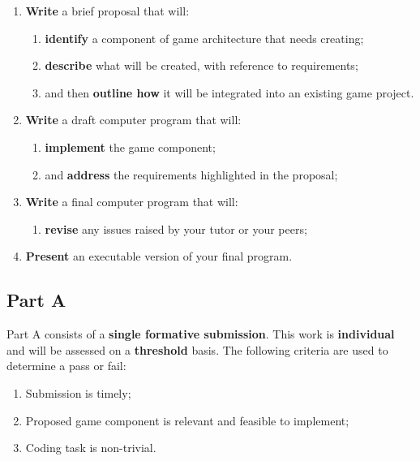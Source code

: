 \documentclass{../fal_assignment}
\begin{document}
\begin{enumerate}[label=(\alph*)]
    \item \textbf{Write} a brief proposal that will:
    	\begin{enumerate}[label=\roman*.]
    		\item \textbf{identify} a component of game architecture that needs creating;
    		\item \textbf{describe} what will be created, with reference to requirements;
    		\item and then \textbf{outline how} it will be integrated into an existing game project.
	\end{enumerate}
    \item \textbf{Write} a draft computer program that will:
        	\begin{enumerate}[label=\roman*.]
    		\item \textbf{implement} the game component;
    		\item and \textbf{address} the requirements highlighted in the proposal;
	\end{enumerate}
    \item \textbf{Write} a final computer program that will:
    	\begin{enumerate}[label=\roman*.]
    		\item \textbf{revise} any issues raised by your tutor or your peers;
	\end{enumerate}
    \item \textbf{Present} an executable version of your final program.
\end{enumerate}


\subsection*{Part A}

Part A consists of a \textbf{single formative submission}. This work is \textbf{individual} and will be assessed on a \textbf{threshold} basis. The following criteria are used to determine a pass or fail:

\begin{enumerate}[label=(\alph*)]
	\item Submission is timely;
	\item Proposed game component is relevant and feasible to implement;
	\item Coding task is non-trivial.
\end{enumerate}
\end{document}
